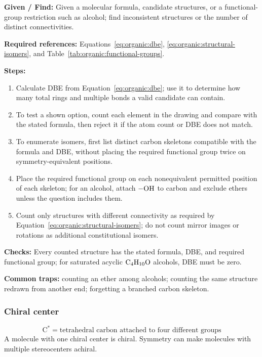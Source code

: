 \textbf{Given / Find:} Given a molecular formula, candidate structures, or a functional-group restriction such as alcohol; find inconsistent structures or the number of distinct connectivities.

\textbf{Required references:} Equations~\eqref{eq:organic:dbe}, \eqref{eq:organic:structural-isomers}, and Table~\ref{tab:organic:functional-groups}.

\textbf{Steps:}
\begin{enumerate}
    \item Calculate DBE from Equation~\eqref{eq:organic:dbe}; use it to determine how many total rings and multiple bonds a valid candidate can contain.
    \item To test a shown option, count each element in the drawing and compare with the stated formula, then reject it if the atom count or DBE does not match.
    \item To enumerate isomers, first list distinct carbon skeletons compatible with the formula and DBE, without placing the required functional group twice on symmetry-equivalent positions.
    \item Place the required functional group on each nonequivalent permitted position of each skeleton; for an alcohol, attach \(\ce{-OH}\) to carbon and exclude ethers unless the question includes them.
    \item Count only structures with different connectivity as required by Equation~\eqref{eq:organic:structural-isomers}; do not count mirror images or rotations as additional constitutional isomers.
\end{enumerate}

\textbf{Checks:} Every counted structure has the stated formula, DBE, and required functional group; for saturated acyclic \(\ce{C4H10O}\) alcohols, DBE must be zero.

\textbf{Common traps:} counting an ether among alcohols; counting the same structure redrawn from another end; forgetting a branched carbon skeleton.

\subsubsection{Chiral center}
\begin{equation}
\label{eq:organic:chiral-center}
\mathrm{C^*}=\text{tetrahedral carbon attached to four different groups}
\end{equation}
A molecule with one chiral center is chiral. Symmetry can make molecules with multiple stereocenters achiral.

